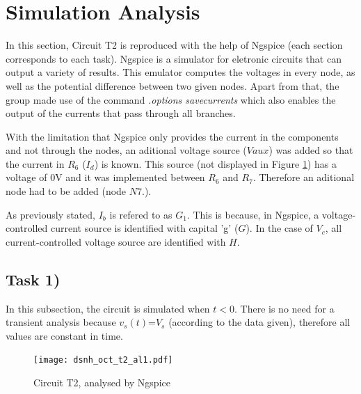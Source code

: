 \section{Simulation Analysis}
\label{sec:simulation}


In this section, Circuit T2 is reproduced with the help of Ngspice (each section corresponds
to each task). Ngspice is a simulator for eletronic circuits that can output a variety of results.
This emulator computes the voltages in every node, as well as the potential difference
between two given nodes. Apart from that, the group made use of the command
{\em .options savecurrents} which also enables the output of the currents that pass
through all branches.

With the limitation that Ngspice only provides the current in the components and not through
the nodes, an aditional voltage source ($Vaux$) was added so that the current in $R_6$ ($I_d$)
is known. This source (not displayed in Figure \ref{fig:Dsnh_sim_t2}) has a voltage of 0V and it 
was implemented between $R_6$ and $R_7$. Therefore an aditional node had to be added (node $N7.$).

As previously stated, $I_b$ is refered to as $G_1$. This is because, in Ngspice, a
voltage-controlled current source is identified with capital 'g' ($G$). In the case of
$V_c$, all current-controlled voltage source are identified with $H$.


\subsection{Task 1)}
\label{subsec:task1_s}


In this subsection, the circuit is simulated when $t<0$. There is no need for a
transient analysis because $v_s(t)$=$V_s$ (according to the data given), therefore
all values are constant in time. 

\begin{figure}[ht]
	\centering
	\texttt{[image: dsnh\_oct\_t2\_al1.pdf]}
	\caption{Circuit T2, analysed by Ngspice}
\label{fig:Dsnh_sim_t2}
\end{figure}

